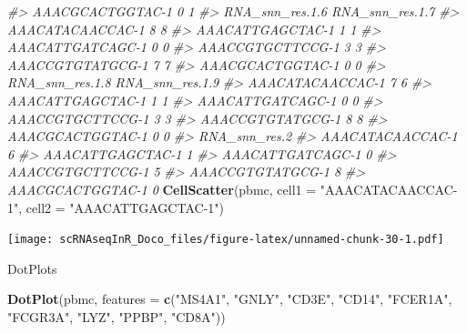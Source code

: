 \documentclass[
]{book}
\newenvironment{Shaded}{\begin{snugshade}}{\end{snugshade}}
\newcommand{\AttributeTok}[1]{\textcolor[rgb]{0.13,0.29,0.53}{#1}}
\newcommand{\CommentTok}[1]{\textcolor[rgb]{0.56,0.35,0.01}{\textit{#1}}}
\newcommand{\FunctionTok}[1]{\textcolor[rgb]{0.13,0.29,0.53}{\textbf{#1}}}
\newcommand{\NormalTok}[1]{#1}
\newcommand{\StringTok}[1]{\textcolor[rgb]{0.31,0.60,0.02}{#1}}
\begin{document}
\begin{Shaded}
\begin{Highlighting}[]
\CommentTok{\#\textgreater{} AAACGCACTGGTAC{-}1               0               1}
\CommentTok{\#\textgreater{}                  RNA\_snn\_res.1.6 RNA\_snn\_res.1.7}
\CommentTok{\#\textgreater{} AAACATACAACCAC{-}1               8               8}
\CommentTok{\#\textgreater{} AAACATTGAGCTAC{-}1               1               1}
\CommentTok{\#\textgreater{} AAACATTGATCAGC{-}1               0               0}
\CommentTok{\#\textgreater{} AAACCGTGCTTCCG{-}1               3               3}
\CommentTok{\#\textgreater{} AAACCGTGTATGCG{-}1               7               7}
\CommentTok{\#\textgreater{} AAACGCACTGGTAC{-}1               0               0}
\CommentTok{\#\textgreater{}                  RNA\_snn\_res.1.8 RNA\_snn\_res.1.9}
\CommentTok{\#\textgreater{} AAACATACAACCAC{-}1               7               6}
\CommentTok{\#\textgreater{} AAACATTGAGCTAC{-}1               1               1}
\CommentTok{\#\textgreater{} AAACATTGATCAGC{-}1               0               0}
\CommentTok{\#\textgreater{} AAACCGTGCTTCCG{-}1               3               3}
\CommentTok{\#\textgreater{} AAACCGTGTATGCG{-}1               8               8}
\CommentTok{\#\textgreater{} AAACGCACTGGTAC{-}1               0               0}
\CommentTok{\#\textgreater{}                  RNA\_snn\_res.2}
\CommentTok{\#\textgreater{} AAACATACAACCAC{-}1             6}
\CommentTok{\#\textgreater{} AAACATTGAGCTAC{-}1             1}
\CommentTok{\#\textgreater{} AAACATTGATCAGC{-}1             0}
\CommentTok{\#\textgreater{} AAACCGTGCTTCCG{-}1             5}
\CommentTok{\#\textgreater{} AAACCGTGTATGCG{-}1             8}
\CommentTok{\#\textgreater{} AAACGCACTGGTAC{-}1             0}
\FunctionTok{CellScatter}\NormalTok{(pbmc, }\AttributeTok{cell1 =} \StringTok{"AAACATACAACCAC{-}1"}\NormalTok{, }\AttributeTok{cell2 =} \StringTok{"AAACATTGAGCTAC{-}1"}\NormalTok{)}
\end{Highlighting}
\end{Shaded}

\texttt{[image: scRNAseqInR\_Doco\_files/figure-latex/unnamed-chunk-30-1.pdf]}

DotPlots

\begin{Shaded}
\begin{Highlighting}[]
\FunctionTok{DotPlot}\NormalTok{(pbmc, }\AttributeTok{features =} \FunctionTok{c}\NormalTok{(}\StringTok{"MS4A1"}\NormalTok{, }\StringTok{"GNLY"}\NormalTok{, }\StringTok{"CD3E"}\NormalTok{, }\StringTok{"CD14"}\NormalTok{, }\StringTok{"FCER1A"}\NormalTok{, }\StringTok{"FCGR3A"}\NormalTok{, }\StringTok{"LYZ"}\NormalTok{, }\StringTok{"PPBP"}\NormalTok{, }\StringTok{"CD8A"}\NormalTok{))}
\end{Highlighting}
\end{Shaded}
\end{document}
